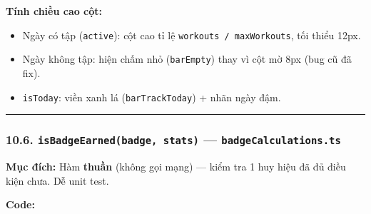 \documentclass[12pt,a4paper]{article}
\begin{document}
\textbf{Tính chiều cao cột:}

\begin{Shaded}
\begin{Highlighting}[]
\OperatorTok{=}
   \NormalTok{(}\OperatorTok{,} \OperatorTok{/}\OperatorTok{*}
  \OperatorTok{:} \OperatorTok{;}
\end{Highlighting}
\end{Shaded}

\begin{itemize}
\tightlist
\item
  Ngày có tập (\texttt{active}): cột cao tỉ lệ
  \texttt{workouts\ /\ maxWorkouts}, tối thiểu 12px.
\item
  Ngày không tập: hiện chấm nhỏ (\texttt{barEmpty}) thay vì cột mờ 8px
  (bug cũ đã fix).
\item
  \texttt{isToday}: viền xanh lá (\texttt{barTrackToday}) + nhãn ngày
  đậm.
\end{itemize}

\begin{center}\rule{0.5\linewidth}{0.5pt}\end{center}

\subsubsection{\texorpdfstring{10.6.
\texttt{isBadgeEarned(badge,\ stats)} ---
\texttt{badgeCalculations.ts}}{10.6. isBadgeEarned(badge, stats) --- badgeCalculations.ts}}\label{isbadgeearnedbadge-stats-badgecalculations.ts}

\textbf{Mục đích:} Hàm \textbf{thuần} (không gọi mạng) --- kiểm tra 1
huy hiệu đã đủ điều kiện chưa. Dễ unit test.

\textbf{Code:}
\end{document}
